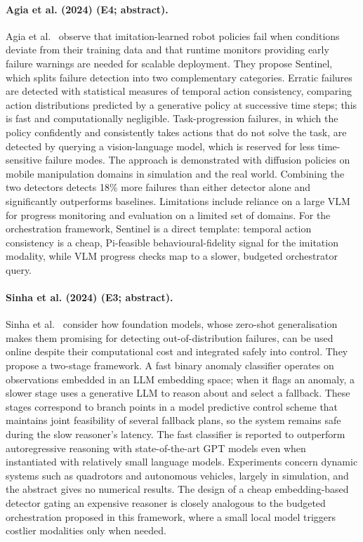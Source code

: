 \documentclass[10pt,a4paper]{article}
\begin{document}
\paragraph{Agia et al. (2024) (E4; abstract).} Agia et al.~\cite{Agia2024} observe that imitation-learned robot policies fail when conditions deviate from their training data and that runtime monitors providing early failure warnings are needed for scalable deployment. They propose Sentinel, which splits failure detection into two complementary categories. Erratic failures are detected with statistical measures of temporal action consistency, comparing action distributions predicted by a generative policy at successive time steps; this is fast and computationally negligible. Task-progression failures, in which the policy confidently and consistently takes actions that do not solve the task, are detected by querying a vision-language model, which is reserved for less time-sensitive failure modes. The approach is demonstrated with diffusion policies on mobile manipulation domains in simulation and the real world. Combining the two detectors detects 18\% more failures than either detector alone and significantly outperforms baselines. Limitations include reliance on a large VLM for progress monitoring and evaluation on a limited set of domains. For the orchestration framework, Sentinel is a direct template: temporal action consistency is a cheap, Pi-feasible behavioural-fidelity signal for the imitation modality, while VLM progress checks map to a slower, budgeted orchestrator query.

\paragraph{Sinha et al. (2024) (E3; abstract).} Sinha et al.~\cite{Sinha2024} consider how foundation models, whose zero-shot generalisation makes them promising for detecting out-of-distribution failures, can be used online despite their computational cost and integrated safely into control. They propose a two-stage framework. A fast binary anomaly classifier operates on observations embedded in an LLM embedding space; when it flags an anomaly, a slower stage uses a generative LLM to reason about and select a fallback. These stages correspond to branch points in a model predictive control scheme that maintains joint feasibility of several fallback plans, so the system remains safe during the slow reasoner's latency. The fast classifier is reported to outperform autoregressive reasoning with state-of-the-art GPT models even when instantiated with relatively small language models. Experiments concern dynamic systems such as quadrotors and autonomous vehicles, largely in simulation, and the abstract gives no numerical results. The design of a cheap embedding-based detector gating an expensive reasoner is closely analogous to the budgeted orchestration proposed in this framework, where a small local model triggers costlier modalities only when needed.
\end{document}
